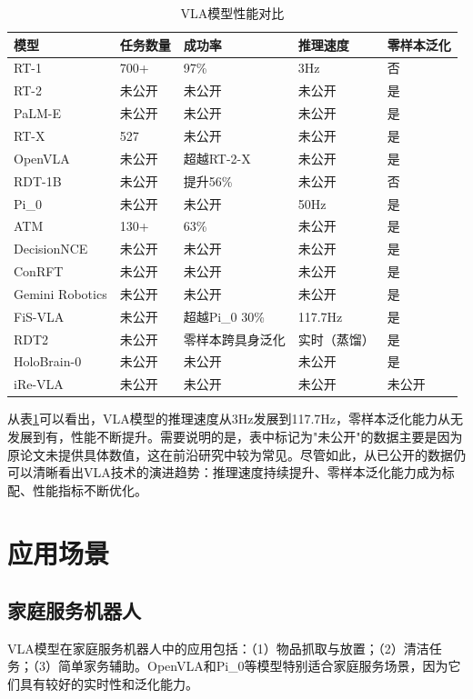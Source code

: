 \documentclass[12pt,a4paper]{article}
\begin{document}
\begin{table}[h]
\centering
\caption{VLA模型性能对比}\label{table:performance}
\small
\begin{tabular}{lp{2cm}p{2.5cm}p{2cm}p{2cm}}
\toprule
模型 & 任务数量 & 成功率 & 推理速度 & 零样本泛化 \\
\midrule
RT-1 & 700+ & 97\% & 3Hz & 否 \\
RT-2 & 未公开 & 未公开 & 未公开 & 是 \\
PaLM-E & 未公开 & 未公开 & 未公开 & 是 \\
RT-X & 527 & 未公开 & 未公开 & 是 \\
OpenVLA & 未公开 & 超越RT-2-X & 未公开 & 是 \\
RDT-1B & 未公开 & 提升56\% & 未公开 & 否 \\
Pi\_0 & 未公开 & 未公开 & 50Hz & 是 \\
ATM & 130+ & 63\% & 未公开 & 是 \\
DecisionNCE & 未公开 & 未公开 & 未公开 & 是 \\
ConRFT & 未公开 & 未公开 & 未公开 & 是 \\
Gemini Robotics & 未公开 & 未公开 & 未公开 & 是 \\
FiS-VLA & 未公开 & 超越Pi\_0 30\% & 117.7Hz & 是 \\
RDT2 & 未公开 & 零样本跨具身泛化 & 实时（蒸馏） & 是 \\
HoloBrain-0 & 未公开 & 未公开 & 未公开 & 是 \\
iRe-VLA & 未公开 & 未公开 & 未公开 & 未公开 \\
\bottomrule
\end{tabular}
\end{table}

从表\ref{table:performance}可以看出，VLA模型的推理速度从3Hz发展到117.7Hz，零样本泛化能力从无发展到有，性能不断提升。需要说明的是，表中标记为"未公开"的数据主要是因为原论文未提供具体数值，这在前沿研究中较为常见。尽管如此，从已公开的数据仍可以清晰看出VLA技术的演进趋势：推理速度持续提升、零样本泛化能力成为标配、性能指标不断优化。

\section{应用场景}

\subsection{家庭服务机器人}

VLA模型在家庭服务机器人中的应用包括：（1）物品抓取与放置；（2）清洁任务；（3）简单家务辅助。OpenVLA和Pi\_0等模型特别适合家庭服务场景，因为它们具有较好的实时性和泛化能力。
\end{document}
